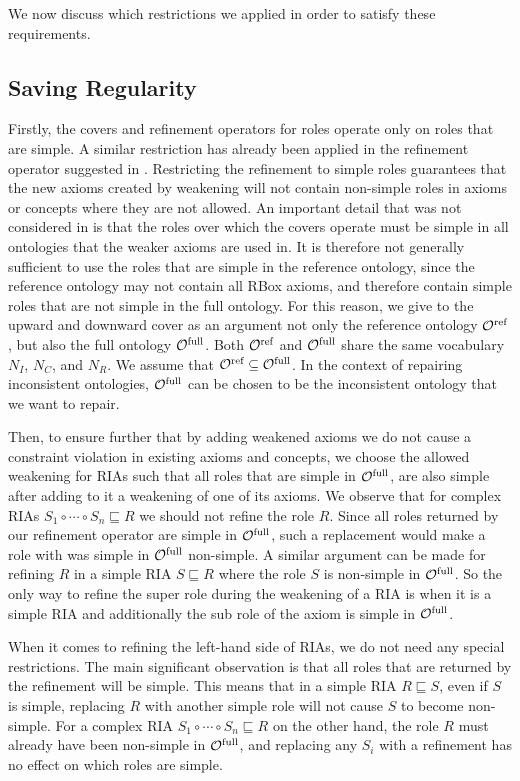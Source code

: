 \documentclass[
]{ceurart}
\begin{document}
We now discuss which restrictions we applied in order to satisfy these requirements.

\subsection{Saving Regularity}

Firstly, the covers and refinement operators for roles operate only on roles that are simple. A similar restriction has already been applied in the refinement operator suggested in \cite{confalonieri2020towards}. Restricting the refinement to simple roles guarantees that the new axioms created by weakening will not contain non-simple roles in axioms or concepts where they are not allowed. An important detail that was not considered in \cite{confalonieri2020towards} is that the roles over which the covers operate must be simple in all ontologies that the weaker axioms are used in. It is therefore not generally sufficient to use the roles that are simple in the reference ontology, since the reference ontology may not contain all RBox axioms, and therefore contain simple roles that are not simple in the full ontology. For this reason, we give to the upward and downward cover as an argument not only the reference ontology ${\mathcal{O}^\textnormal{ref}}$, but also the full ontology ${\mathcal{O}^\textnormal{full}}$. Both ${\mathcal{O}^\textnormal{ref}}$ and ${\mathcal{O}^\textnormal{full}}$ share the same vocabulary $N_I$, $N_C$, and $N_R$. We assume that ${\mathcal{O}^\textnormal{ref}} \subseteq {\mathcal{O}^\textnormal{full}}$. In the context of repairing inconsistent ontologies, ${\mathcal{O}^\textnormal{full}}$ can be chosen to be the inconsistent ontology that we want to repair.

Then, to ensure further that by adding weakened axioms we do not cause a constraint violation in existing axioms and concepts, we choose the allowed weakening for RIAs such that all roles that are simple in ${\mathcal{O}^\textnormal{full}}$, are also simple after adding to it a weakening of one of its axioms. We observe that for complex RIAs $S_1 \circ \cdots \circ S_n \sqsubseteq R$ we should not refine the role $R$. Since all roles returned by our refinement operator are simple in ${\mathcal{O}^\textnormal{full}}$, such a replacement would make a role with was simple in ${\mathcal{O}^\textnormal{full}}$ non-simple. A similar argument can be made for refining $R$ in a simple RIA $S \sqsubseteq R$ where the role $S$ is non-simple in ${\mathcal{O}^\textnormal{full}}$. So the only way to refine the super role during the weakening of a RIA is when it is a simple RIA and additionally the sub role of the axiom is simple in ${\mathcal{O}^\textnormal{full}}$.

When it comes to refining the left-hand side of RIAs, we do not need any special restrictions. The main significant observation is that all roles that are returned by the refinement will be simple. This means that in a simple RIA $R \sqsubseteq S$, even if $S$ is simple, replacing $R$ with another simple role will not cause $S$ to become non-simple. For a complex RIA $S_1 \circ \cdots \circ S_n \sqsubseteq R$ on the other hand, the role $R$ must already have been non-simple in ${\mathcal{O}^\textnormal{full}}$, and replacing any $S_i$ with a refinement has no effect on which roles are simple.
\end{document}
